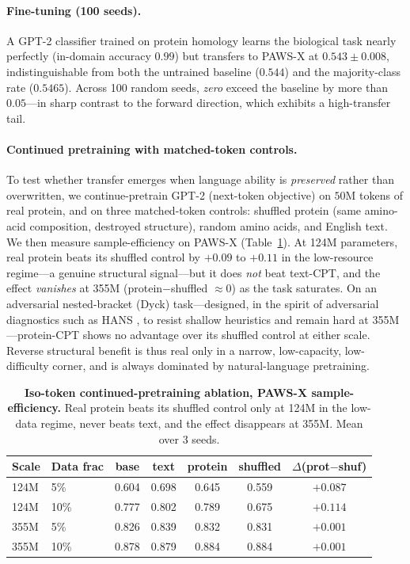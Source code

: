 \documentclass[11pt]{article}
\begin{document}
\paragraph{Fine-tuning (100 seeds).} A GPT-2 classifier trained on protein homology learns the
biological task nearly perfectly (in-domain accuracy $0.99$) but transfers to PAWS-X at
$0.543 \pm 0.008$, indistinguishable from both the untrained baseline ($0.544$) and the
majority-class rate ($0.5465$). Across 100 random seeds, \emph{zero} exceed the baseline by more
than $0.05$---in sharp contrast to the forward direction, which exhibits a high-transfer tail.

\paragraph{Continued pretraining with matched-token controls.} To test whether transfer emerges
when language ability is \emph{preserved} rather than overwritten, we continue-pretrain GPT-2
(next-token objective) on $50$M tokens of real protein, and on three matched-token controls:
shuffled protein (same amino-acid composition, destroyed structure), random amino acids, and
English text. We then measure sample-efficiency on PAWS-X (Table~\ref{tab:cpt}). At 124M
parameters, real protein beats its shuffled control by $+0.09$ to $+0.11$ in the low-resource
regime---a genuine structural signal---but it does \emph{not} beat text-CPT, and the effect
\emph{vanishes} at 355M (protein$-$shuffled $\approx 0$) as the task saturates. On an adversarial
nested-bracket (Dyck) task---designed, in the spirit of adversarial diagnostics such as HANS
\cite{mccoy2019hans}, to resist shallow heuristics and remain hard at 355M---protein-CPT shows no
advantage over its shuffled control at either scale. Reverse structural benefit is thus real only in a narrow,
low-capacity, low-difficulty corner, and is always dominated by natural-language pretraining.

\begin{table}[t]
\centering
\caption{\textbf{Iso-token continued-pretraining ablation, PAWS-X sample-efficiency.}
Real protein beats its shuffled control only at 124M in the low-data regime, never beats text,
and the effect disappears at 355M. Mean over 3 seeds.}
\label{tab:cpt}
\begin{tabular}{llccccc}
\toprule
Scale & Data frac & base & text & protein & shuffled & $\Delta$(prot$-$shuf) \\
\midrule
124M & 5\%  & 0.604 & 0.698 & 0.645 & 0.559 & $+0.087$ \\
124M & 10\% & 0.777 & 0.802 & 0.789 & 0.675 & $+0.114$ \\
355M & 5\%  & 0.826 & 0.839 & 0.832 & 0.831 & $+0.001$ \\
355M & 10\% & 0.878 & 0.879 & 0.884 & 0.884 & $+0.001$ \\
\bottomrule
\end{tabular}
\end{table}
\end{document}
